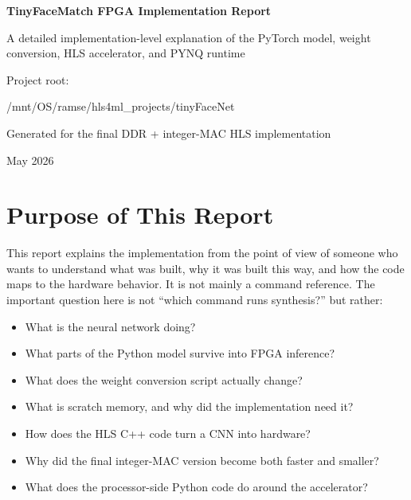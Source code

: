\documentclass[11pt]{article}
\begin{document}
\begin{titlepage}
  \centering
  \vspace*{1.2in}
  {\Huge\bfseries TinyFaceMatch FPGA Implementation Report\par}
  \vspace{0.35in}
  {\Large A detailed implementation-level explanation of the PyTorch model, weight conversion, HLS accelerator, and PYNQ runtime\par}
  \vspace{0.9in}
  {\large Project root:\par}
  \vspace{0.1in}
  {\ttfamily /mnt/OS/ramse/hls4ml\_projects/tinyFaceNet\par}
  \vfill
  {\large Generated for the final DDR + integer-MAC HLS implementation\par}
  \vspace{0.2in}
  {\large May 2026\par}
\end{titlepage}

\tableofcontents
\newpage

\section{Purpose of This Report}

This report explains the implementation from the point of view of someone who wants to understand what was built, why it was built this way, and how the code maps to the hardware behavior.
It is not mainly a command reference.
The important question here is not ``which command runs synthesis?'' but rather:

\begin{itemize}[leftmargin=1.4em]
  \item What is the neural network doing?
  \item What parts of the Python model survive into FPGA inference?
  \item What does the weight conversion script actually change?
  \item What is scratch memory, and why did the implementation need it?
  \item How does the HLS C++ code turn a CNN into hardware?
  \item Why did the final integer-MAC version become both faster and smaller?
  \item What does the processor-side Python code do around the accelerator?
\end{itemize}
\end{document}
